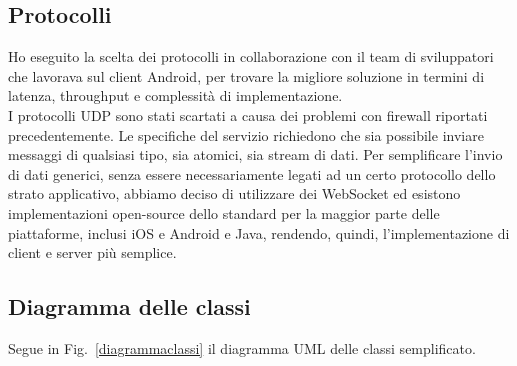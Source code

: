 	\subsection{Protocolli}
	Ho eseguito la scelta dei protocolli in collaborazione con il team di sviluppatori che lavorava sul client Android, per trovare la migliore soluzione in termini di latenza, throughput e complessità di implementazione.
	\\
	I protocolli UDP sono stati scartati a causa dei problemi con firewall riportati precedentemente.
	Le specifiche del servizio richiedono che sia possibile inviare messaggi di qualsiasi tipo, sia atomici, sia stream di dati. Per semplificare l'invio di dati generici, senza essere necessariamente legati ad un certo protocollo dello strato applicativo, abbiamo deciso di utilizzare dei WebSocket ed esistono implementazioni open-source dello standard per la maggior parte delle piattaforme, inclusi iOS e Android e Java, rendendo, quindi, l'implementazione di client e server più semplice.
	
	\subsection{Diagramma delle classi}
	Segue in Fig.~\ref{diagrammaclassi} il diagramma UML delle classi semplificato.

